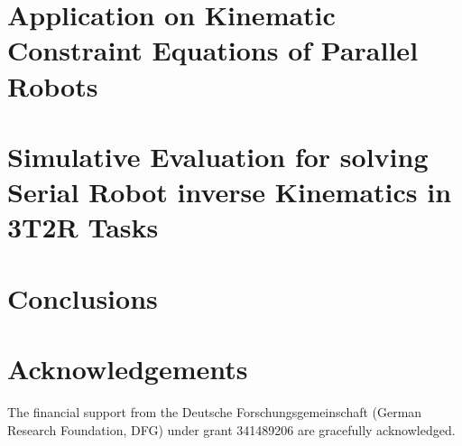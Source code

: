 \documentclass[twocolumn,10pt]{IFTOMM}
\begin{document}
\section{Application on Kinematic Constraint Equations of Parallel Robots}
\label{sec:ParRobKinConstr}

\section{Simulative Evaluation for solving Serial Robot inverse Kinematics in 3T2R Tasks}
\label{sec:SimEvalSerRobIK}

\section{Conclusions}
\label{sec:Conclusion}

\section{Acknowledgements}

The financial support from the Deutsche Forschungsgemeinschaft (German Research Foundation, DFG) under grant 341489206 are gracefully acknowledged.



\end{document}
